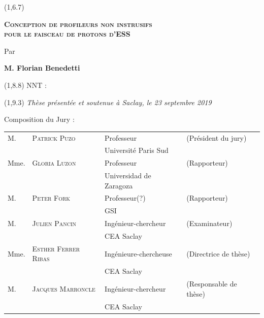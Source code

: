 \begin{titlepage}
	\begin{textblock}{14}(1,6.7)
		\begin{center}	
			\Large \textsc{\textcolor{ESSColor}{
					\textbf{Conception de profileurs non instrusifs \\pour le faisceau de protons d’ESS}}}\par
			\large Par\par  \large \textbf{M. Florian Benedetti} \par
		\end{center}
	\end{textblock}
	
	\begin{textblock}{13}(1,8.8)
		NNT : 
	\end{textblock}
	
	\begin{textblock}{14}(1,9.3)
		\vspace{1.5cm}
		\hspace{1cm}\textit{Thèse présentée et soutenue à Saclay, le 23 septembre 2019}
		\vspace{0.5cm}
		\par
		\hspace{1cm}Composition du Jury :
		\begin{center}
			\begin{tabular}{llll}
				M.    & \textsc{Patrick Puzo}        & Professeur              & (Président du jury)    \\
				\null & \null                        & Université Paris Sud    &                        \\   
				
				Mme.  & \textsc{Gloria Luzon}        & Professeur              & (Rapporteur)           \\
				\null & \null                        & Universidad de Zaragoza &                        \\ 
				
				M.    & \textsc{Peter Fork}          & Professeur(?)           & (Rapporteur)           \\
				\null & \null                        & GSI                     &                        \\ 
				M.    & \textsc{Julien Pancin}       & Ingénieur-chercheur     & (Examinateur)          \\
				\null & \null                        & CEA Saclay              &                        \\ 				
				Mme.  & \textsc{Esther Ferrer Ribas} & Ingénieure-chercheuse   & (Directrice de thèse)  \\
				\null & \null                        & CEA Saclay              &                        \\ 
				
				M.    & \textsc{Jacques Marroncle}   & Ingénieur-chercheur     & (Responsable de thèse) \\
				\null & \null                        & CEA Saclay              &                        \\ 		
			\end{tabular}
		\end{center}
	\end{textblock}
\end{titlepage}